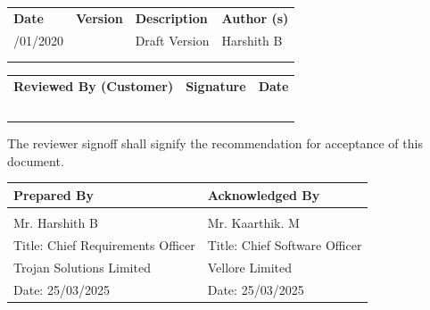 \begin{longtable}[]{@{}
  >{\raggedright\arraybackslash}p{}
  >{\raggedright\arraybackslash}p{}
  >{\raggedright\arraybackslash}p{}
  >{\raggedright\arraybackslash}p{}@{}}
\toprule\noalign{}
\endhead
\bottomrule\noalign{}
\endlastfoot
\textbf{Date} & \textbf{Version} & \textbf{Description} & \textbf{Author
(s)} \\
/01/2020 & & Draft Version & Harshith B \\
& & & \\
& & & \\
\end{longtable}

\begin{longtable}[]{@{}
  >{\raggedright\arraybackslash}p{}
  >{\raggedright\arraybackslash}p{}
  >{\raggedright\arraybackslash}p{}@{}}
\toprule\noalign{}
\endhead
\bottomrule\noalign{}
\endlastfoot
\textbf{Reviewed By (Customer)} & \textbf{Signature} & \textbf{Date} \\
& & \\
& & \\
& & \\
& & \\
& & \\
\end{longtable}

The reviewer signoff shall signify the recommendation for acceptance of
this document.

\begin{longtable}[]{@{}
  >{\raggedright\arraybackslash}p{}
  >{\raggedright\arraybackslash}p{}@{}}
\toprule\noalign{}
\begin{minipage}[b]{\linewidth}\raggedright
\textbf{Prepared By}
\end{minipage} & \begin{minipage}[b]{\linewidth}\raggedright
\textbf{Acknowledged By}
\end{minipage} \\
\midrule\noalign{}
\endhead
\bottomrule\noalign{}
\endlastfoot
& \\
Mr. Harshith B & Mr. Kaarthik. M \\
Title: Chief Requirements Officer & Title: Chief Software Officer \\
Trojan Solutions Limited & Vellore Limited \\
Date: 25/03/2025 & Date: 25/03/2025 \\
\end{longtable}

